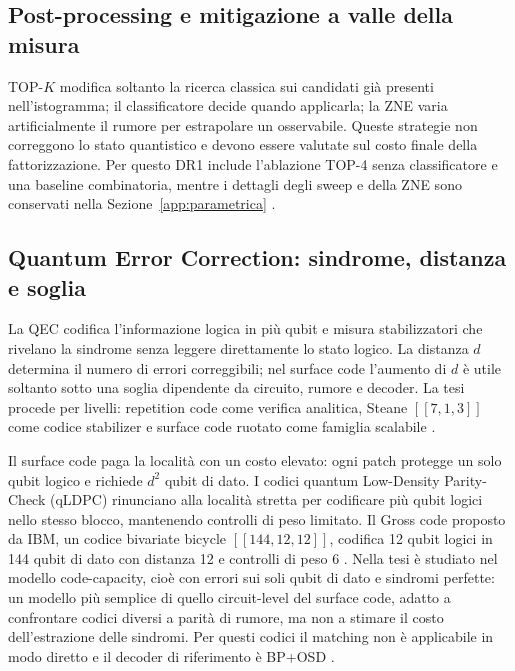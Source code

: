 \subsection{Post-processing e mitigazione a valle della misura}\label{sec:finale_3_4_1}

TOP-$K$ modifica soltanto la ricerca classica sui candidati già presenti nell'istogramma; il classificatore decide quando applicarla; la ZNE varia artificialmente il rumore per estrapolare un osservabile. Queste strategie non correggono lo stato quantistico e devono essere valutate sul costo finale della fattorizzazione. Per questo DR1 include l'ablazione TOP-4 senza classificatore e una baseline combinatoria, mentre i dettagli degli sweep e della ZNE sono conservati nella Sezione~\ref{app:parametrica} \cite{temme2017,liBenjamin2017}.

\subsection{Quantum Error Correction: sindrome, distanza e soglia}\label{sec:finale_3_4_2}

La QEC codifica l'informazione logica in più qubit e misura stabilizzatori che rivelano la sindrome senza leggere direttamente lo stato logico. La distanza $d$ determina il numero di errori correggibili; nel surface code l'aumento di $d$ è utile soltanto sotto una soglia dipendente da circuito, rumore e decoder. La tesi procede per livelli: repetition code come verifica analitica, Steane $[[7,1,3]]$ come codice stabilizer e surface code ruotato come famiglia scalabile \cite{shorcorrection1995,steane1996,fowler2012,dennis2002topological,googleQECBelowThreshold2025}.

Il surface code paga la località con un costo elevato: ogni patch protegge un solo qubit logico e richiede $d^2$ qubit di dato. I codici quantum Low-Density Parity-Check (qLDPC) rinunciano alla località stretta per codificare più qubit logici nello stesso blocco, mantenendo controlli di peso limitato. Il Gross code proposto da IBM, un codice bivariate bicycle $[[144,12,12]]$, codifica 12 qubit logici in 144 qubit di dato con distanza 12 e controlli di peso 6 \cite{bravyi2024}. Nella tesi è studiato nel modello code-capacity, cioè con errori sui soli qubit di dato e sindromi perfette: un modello più semplice di quello circuit-level del surface code, adatto a confrontare codici diversi a parità di rumore, ma non a stimare il costo dell'estrazione delle sindromi. Per questi codici il matching non è applicabile in modo diretto e il decoder di riferimento è BP+OSD \cite{roffe2020,panteleev2021}.

